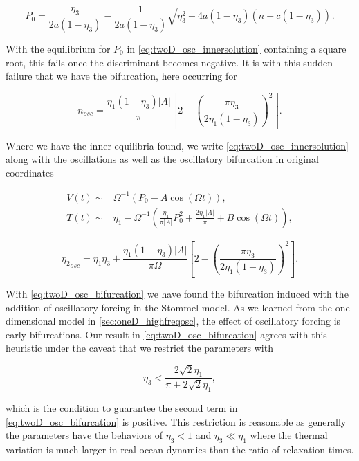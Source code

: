 \begin{equation}\label{eq:twoD_osc_innersolution}
P_0=\frac{\eta_3}{2a(1-\eta_3)}- \frac{1}{2a(1-\eta_3)}\sqrt{\eta_3^2+4a(1-\eta_3)(n-c(1-\eta_3))}.
\end{equation}

With the equilibrium for $P_0$ in \eqref{eq:twoD_osc_innersolution} containing a square root, this fails once the discriminant becomes negative. It is with this sudden failure that we have the bifurcation, here occurring for

\begin{equation*}
n_{osc} = \frac{\eta_1(1-\eta_3)|A|}{\pi}\left[2-\left(\frac{\pi\eta_3}{2\eta_1(1-\eta_3)}\right)^2\right].
\end{equation*}

Where we have the inner equilibria found, we write \eqref{eq:twoD_osc_innersolution} along with the oscillations as well as the oscillatory bifurcation in original coordinates

\begin{equation}\label{eq:twoD_osc_innersolnoriginal}
\begin{aligned}
V(t)\sim& \Omega^{-1}\left(P_0-A\cos(\Omega t)\right),\\
T(t)\sim& \eta_1-\Omega^{-1}\left(\frac{\eta_1}{\pi|A|}P_0^2+\frac{2\eta_1|A|}{\pi}+B\cos(\Omega t)\right),
\end{aligned}
\end{equation}

\begin{equation}\label{eq:twoD_osc_bifurcation}
{\eta_2}_{osc} = \eta_1\eta_3+\frac{\eta_1(1-\eta_3)|A|}{\pi\Omega}\left[2-\left(\frac{\pi\eta_3}{2\eta_1(1-\eta_3)}\right)^2\right].
\end{equation}

With \eqref{eq:twoD_osc_bifurcation} we have found the bifurcation induced with the addition of oscillatory forcing in the Stommel model. As we learned from the one-dimensional model in \autoref{sec:oneD_highfreqosc}, the effect of oscillatory forcing is early bifurcations. Our result in \eqref{eq:twoD_osc_bifurcation} agrees with this heuristic under the caveat that we restrict the parameters with 

\begin{equation*}
\eta_3 <\frac{2\sqrt{2}\eta_1}{\pi+2\sqrt{2}\eta_1},
\end{equation*}

which is the condition to guarantee the second term in \eqref{eq:twoD_osc_bifurcation} is positive. This restriction is reasonable as generally the parameters have the behaviors of $\eta_3<1$ and $\eta_3\ll \eta_1$ where the thermal variation is much larger in real ocean dynamics than the ratio of relaxation times.

